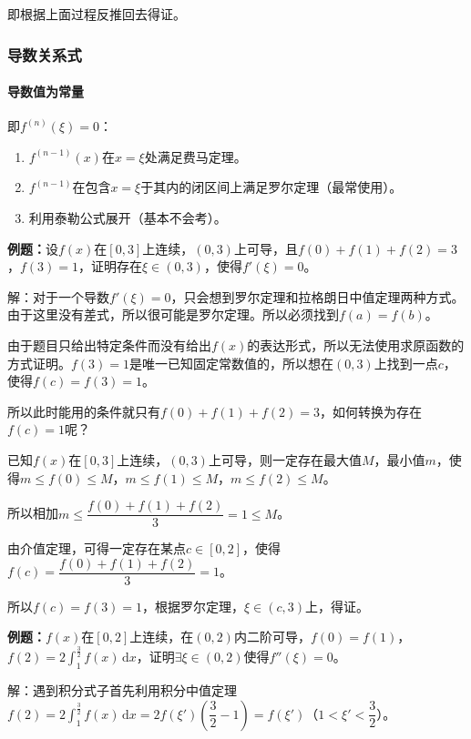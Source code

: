 \documentclass[UTF8, 12pt]{ctexart}
\begin{document}
即根据上面过程反推回去得证。

\subsubsection{导数关系式}

\paragraph{导数值为常量} \leavevmode \medskip

即$f^{(n)}(\xi)=0$：

\begin{enumerate}
    \item $f^{(n-1)}(x)$在$x=\xi$处满足费马定理。
    \item $f^{(n-1)}$在包含$x=\xi$于其内的闭区间上满足罗尔定理（最常使用）。
    \item 利用泰勒公式展开（基本不会考）。
\end{enumerate}

\textbf{例题：}设$f(x)$在$[0,3]$上连续，$(0,3)$上可导，且$f(0)+f(1)+f(2)=3$，$f(3)=1$，证明存在$\xi\in(0,3)$，使得$f'(\xi)=0$。

解：对于一个导数$f'(\xi)=0$，只会想到罗尔定理和拉格朗日中值定理两种方式。由于这里没有差式，所以很可能是罗尔定理。所以必须找到$f(a)=f(b)$。

由于题目只给出特定条件而没有给出$f(x)$的表达形式，所以无法使用求原函数的方式证明。$f(3)=1$是唯一已知固定常数值的，所以想在$(0,3)$上找到一点$c$，使得$f(c)=f(3)=1$。

所以此时能用的条件就只有$f(0)+f(1)+f(2)=3$，如何转换为存在$f(c)=1$呢？

已知$f(x)$在$[0,3]$上连续，$(0,3)$上可导，则一定存在最大值$M$，最小值$m$，使得$m\leqslant f(0)\leqslant M$，$m\leqslant f(1)\leqslant M$，$m\leqslant f(2)\leqslant M$。\medskip

所以相加$m\leqslant\dfrac{f(0)+f(1)+f(2)}{3}=1\leqslant M$。

由介值定理，可得一定存在某点$c\in[0,2]$，使得$f(c)=\dfrac{f(0)+f(1)+f(2)}{3}=1$。

所以$f(c)=f(3)=1$，根据罗尔定理，$\xi\in(c,3)$上，得证。

\textbf{例题：}$f(x)$在$[0,2]$上连续，在$(0,2)$内二阶可导，$f(0)=f(1)$，$f(2)=2\int_1^{\frac{3}{2}}f(x)\,\textrm{d}x$，证明$\exists\xi\in(0,2)$使得$f''(\xi)=0$。

解：遇到积分式子首先利用积分中值定理$f(2)=2\int_1^{\frac{3}{2}}f(x)\,\textrm{d}x=2f(\xi')(\dfrac{3}{2}-1)=f(\xi')$（$1<\xi'<\dfrac{3}{2}$）。
\end{document}
